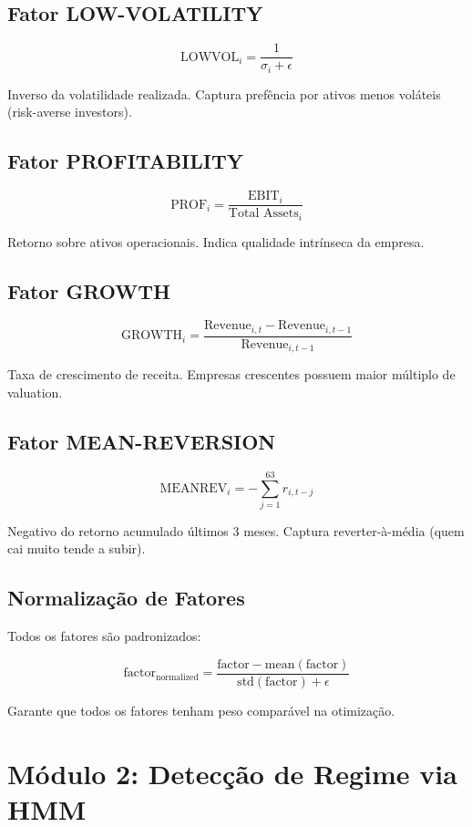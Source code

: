 \documentclass[12pt,a4paper]{article}
\begin{document}
\subsection{Fator LOW-VOLATILITY}

\[
\text{LOWVOL}_i = \frac{1}{\sigma_i + \epsilon}
\]

Inverso da volatilidade realizada. Captura prefência por ativos menos voláteis (risk-averse investors).

\subsection{Fator PROFITABILITY}

\[
\text{PROF}_i = \frac{\text{EBIT}_i}{\text{Total Assets}_i}
\]

Retorno sobre ativos operacionais. Indica qualidade intrínseca da empresa.

\subsection{Fator GROWTH}

\[
\text{GROWTH}_i = \frac{\text{Revenue}_{i,t} - \text{Revenue}_{i,t-1}}{\text{Revenue}_{i,t-1}}
\]

Taxa de crescimento de receita. Empresas crescentes possuem maior múltiplo de valuation.

\subsection{Fator MEAN-REVERSION}

\[
\text{MEANREV}_i = -\sum_{j=1}^{63} r_{i,t-j}
\]

Negativo do retorno acumulado últimos 3 meses. Captura reverter-à-média (quem cai muito tende a subir).

\subsection{Normalização de Fatores}

Todos os fatores são padronizados:

\[
\text{factor}_{\text{normalized}} = \frac{\text{factor} - \text{mean}(\text{factor})}{\text{std}(\text{factor}) + \epsilon}
\]

Garante que todos os fatores tenham peso comparável na otimização.

\section{Módulo 2: Detecção de Regime via HMM}
\end{document}
